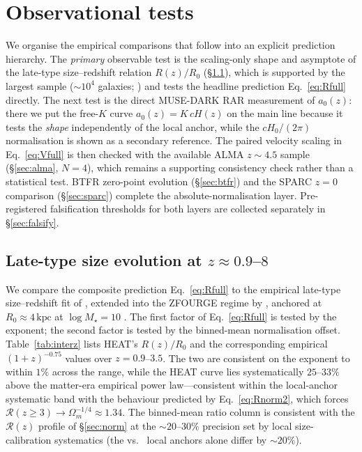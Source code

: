 \documentclass[twocolumn,letterpaper]{aastex631}
\newcommand{\azero}{a_0}
\begin{document}
\section{Observational tests}\label{sec:tests}

We organise the empirical comparisons that follow into an
explicit prediction hierarchy.  The \emph{primary} observable
test is the scaling-only shape and asymptote of the late-type
size--redshift relation $R(z)/R_{0}$ (\S\ref{sec:interz}), which
is supported by the largest sample ($\sim 10^{4}$ galaxies;
\citealt{vanderWel2014}) and tests the headline prediction
Eq.~\ref{eq:Rfull} directly.  The next test is the direct
MUSE-DARK RAR measurement of $\azero(z)$: there we put the
free-$K$ curve $\azero(z)=K\,cH(z)$ on the main line because it
tests the \emph{shape} independently of the local anchor, while
the $cH_0/(2\pi)$ normalisation is shown as a secondary reference.
The paired velocity scaling in Eq.~\ref{eq:Vfull} is then checked
with the available ALMA $z\!\sim\!4.5$ sample (\S\ref{sec:alma},
$N\!=\!4$), which remains a supporting consistency check rather
than a statistical test.  BTFR zero-point evolution
(\S\ref{sec:btfr}) and the SPARC $z\!=\!0$ comparison
(\S\ref{sec:sparc}) complete the absolute-normalisation layer.
Pre-registered falsification thresholds for both layers are
collected separately in \S\ref{sec:falsify}.

\subsection{Late-type size evolution at
  $z\approx 0.9$--$8$}\label{sec:interz}

We compare the composite prediction Eq.~\ref{eq:Rfull} to the
empirical late-type size--redshift fit of \citet{vanderWel2014},
extended into the ZFOURGE regime by \citet{Allen2017}, anchored
at $R_{0}\!\approx\!4\,\mathrm{kpc}$ at $\log M_{\star}=10$
\citep{Shen2003}.  The first factor of Eq.~\ref{eq:Rfull} is
tested by the exponent; the second factor is tested by the
binned-mean normalisation offset.
Table~\ref{tab:interz} lists HEAT's $R(z)/R_{0}$ and the
corresponding empirical $(1+z)^{-0.75}$ values over
$z=0.9$--$3.5$.  The two are consistent on the exponent to
within $1\%$ across the range, while the HEAT curve lies
systematically $25$--$33\%$ above the matter-era empirical
power law---consistent within the local-anchor systematic
band with the behaviour predicted by Eq.~\ref{eq:Rnorm2},
which forces
$\mathcal{R}(z\geq 3)\to\Omega_{m}^{-1/4}\!\approx\!1.34$.
The binned-mean ratio column is consistent with the
$\mathcal{R}(z)$ profile of \S\ref{sec:norm} at the
$\sim 20$--$30\%$ precision set by local size-calibration
systematics (the \citealt{Shen2003} vs.\ \citealt{vanderWel2014}
local anchors alone differ by $\sim 20\%$).
\end{document}
